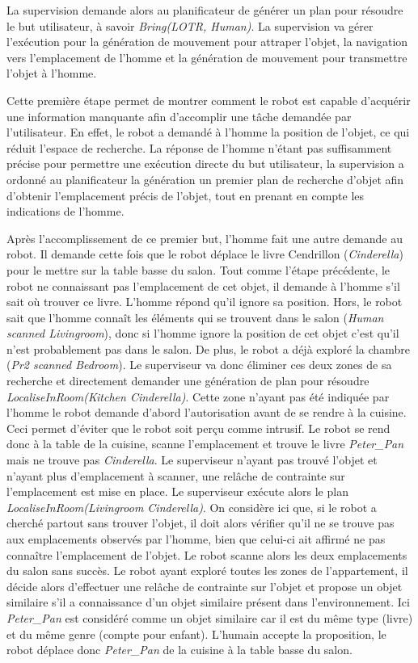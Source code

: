 \documentclass[a4paper,11pt,twoside]{StyleThese}
\begin{document}
La supervision demande alors au planificateur de générer un plan pour résoudre le but utilisateur, à savoir \textit{Bring(LOTR, Human)}.
La supervision va gérer l'exécution pour la génération de mouvement pour attraper l'objet, la navigation vers l'emplacement de l'homme et la génération de mouvement pour transmettre l'objet à l'homme.

Cette première étape permet de montrer comment le robot est capable d'acquérir une information manquante afin d'accomplir une tâche demandée par l'utilisateur. En effet, le robot a demandé à l'homme la position de l'objet, ce qui réduit l'espace de recherche. La réponse de l'homme n'étant pas suffisamment précise pour permettre une exécution directe du but utilisateur, la supervision a ordonné au planificateur la génération un premier plan de recherche d'objet afin d'obtenir l'emplacement précis de l'objet, tout en prenant en compte les indications de l'homme.

Après l'accomplissement de ce premier but, l'homme fait une autre demande au robot. Il demande cette fois que le robot déplace le livre Cendrillon (\textit{Cinderella}) pour le mettre sur la table basse du salon.
Tout comme l'étape précédente, le robot ne connaissant pas l'emplacement de cet objet, il demande à l'homme s'il sait où trouver ce livre.
L'homme répond qu'il ignore sa position.
Hors, le robot sait que l'homme connaît les éléments qui se trouvent dans le salon (\textit{Human scanned  Livingroom}), donc si l'homme ignore la position de cet objet c'est qu'il n'est probablement pas dans le salon. De plus, le robot a déjà exploré la chambre (\textit{Pr2 scanned Bedroom}). Le superviseur va donc éliminer ces deux zones de sa recherche et directement demander une génération de plan pour résoudre \textit{LocaliseInRoom(Kitchen Cinderella)}. Cette zone n'ayant pas été indiquée par l'homme le robot demande d'abord l'autorisation avant de se rendre à la cuisine. Ceci permet d'éviter que le robot soit perçu comme intrusif.
Le robot se rend donc à la table de la cuisine, scanne l'emplacement et trouve le livre \textit{Peter\_Pan} mais ne trouve pas \textit{Cinderella}.
Le superviseur n'ayant pas trouvé l'objet et n'ayant plus d'emplacement à scanner, une relâche de contrainte sur l'emplacement est mise en place.
Le superviseur exécute alors le plan \textit{LocaliseInRoom(Livingroom Cinderella)}. On considère ici que, si le robot a cherché partout sans trouver l'objet, il doit alors vérifier qu'il ne se trouve pas aux emplacements observés par l'homme, bien que celui-ci ait affirmé ne pas connaître l'emplacement de l'objet.
Le robot scanne alors les deux emplacements du salon sans succès.
Le robot ayant exploré toutes les zones de l'appartement, il décide alors d'effectuer une relâche de contrainte sur l'objet et propose un objet similaire s'il a connaissance d'un objet similaire présent dans l'environnement.
Ici \textit{Peter\_Pan} est considéré comme un objet similaire car il est du même type (livre) et du même genre (compte pour enfant).
L'humain accepte la proposition, le robot déplace donc \textit{Peter\_Pan} de la cuisine à la table basse du salon.
\end{document}
